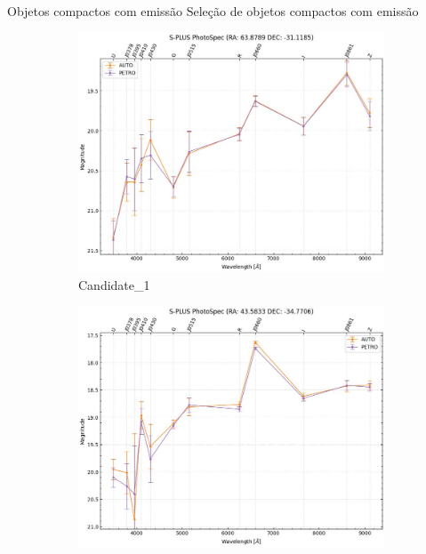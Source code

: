 \begin{frame}[c]{Objetos compactos com emissão}
Seleção de objetos compactos com emissão
\vspace{-0.5cm}
\begin{figure}[h]
    \centering
    \captionsetup{justification=centering}
    \begin{subfigure}[b]{0.25\textwidth}
        \includegraphics[width=\textwidth]{images/photo_specs/Candidate_1.png}
        \caption{Candidate\_1}
    \end{subfigure}
    \begin{subfigure}[b]{0.25\textwidth}
        \includegraphics[width=\textwidth]{images/photo_specs/Candidate_2.png}

\end{subfigure}
\end{figure}
\end{frame}
